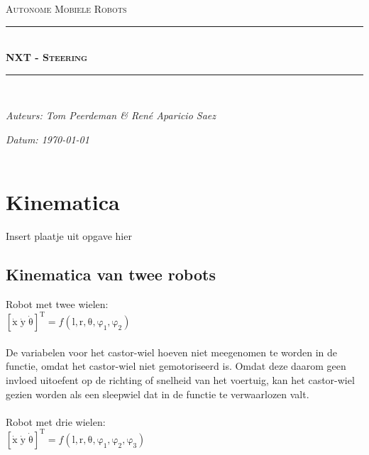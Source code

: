 \documentclass[a4paper]{article}
\newcommand{\HRule}{\rule{\linewidth}{0.5mm}}
\begin{document}
\begin{titlepage}
\begin{center}
\textsc{\Large Autonome Mobiele Robots}\\[0.5cm]
\HRule \\[0,4cm]
\textsc{\huge \bfseries NXT - Steering}
\HRule \\[8cm]
\begin{minipage}{0.4\textwidth}
\begin{flushleft}\large
\emph{Auteurs: Tom Peerdeman \& Ren\'e Aparicio Saez}\\
\end{flushleft}
\end{minipage}
\begin{minipage}{0.4\textwidth}
\begin{flushright}\large
\emph{Datum: \today\\\hspace{1cm}}\\
\end{flushright}
\end{minipage}
\end{center}
\end{titlepage}

\section{Kinematica}
Insert plaatje uit opgave hier

\subsection{Kinematica van twee robots}
Robot met twee wielen:\\
$\mathrm{[\dot{x}\; \dot{y}\; \dot{\theta}]^T} = f\mathrm{(l, r, \theta, \varphi_{1}, \varphi_{2})}$\\
\\
De variabelen voor het castor-wiel hoeven niet meegenomen te worden in de functie, omdat het castor-wiel niet gemotoriseerd is. Omdat deze daarom geen invloed uitoefent op de richting of snelheid van het voertuig, kan het castor-wiel gezien worden als een sleepwiel dat in de functie te verwaarlozen valt.\\\\
Robot met drie wielen:\\
$\mathrm{[\dot{x}\; \dot{y}\; \dot{\theta}]^T} = f\mathrm{(l, r, \theta, \varphi_{1}, \varphi_{2}, \varphi_{3})}$\\
\end{document}
